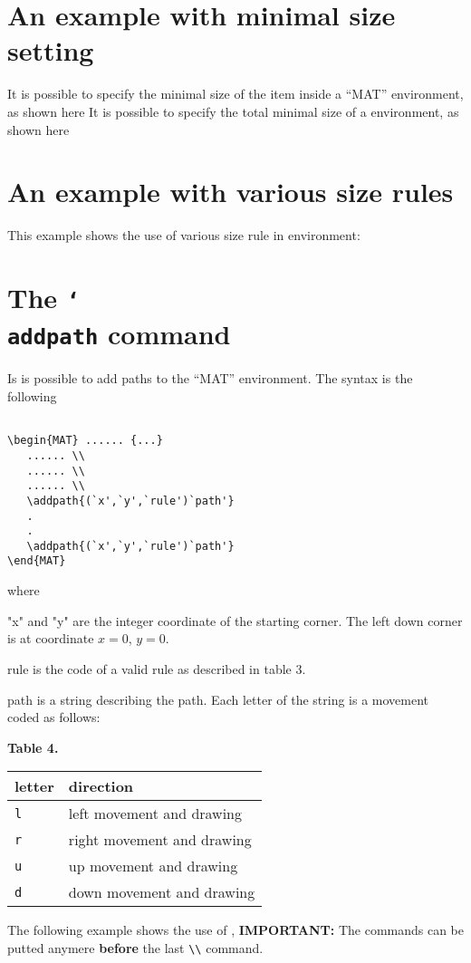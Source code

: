 \documentclass[a4paper]{article}
\begin{document}
\section{An example with minimal size setting}
It is possible to specify the minimal size of the item inside a ``MAT''
environment, as shown here
%
%
It is possible to specify the total minimal size of a 
environment, as shown here
%
%


\section{An example with various size rules}
This example shows the use of various size rule in  
environment:
%
%


\section{The \texttt{\char`\\addpath} command}
Is is possible to add paths to the ``MAT'' environment. The syntax 
is the following
\begin{verbatim}

\begin{MAT} ...... {...}
   ...... \\
   ...... \\
   ...... \\
   \addpath{(`x',`y',`rule')`path'}
   .
   .
   \addpath{(`x',`y',`rule')`path'}
\end{MAT}

\end{verbatim}
where
\begin{desc}
  \item["x" and "y"] are the integer coordinate of the starting
  corner.  The left down corner is at coordinate $x=0$, $y=0$.
  \item[rule] is the code of a valid rule as described in table 3.
  \item[path] is a string describing the path.  Each letter of the
  string is a movement coded as follows:
  \begin{center}
    \textbf{Table 4.} \\[1em]
    \begin{tabular}{|l|l|}
      \hline
      letter & direction \\
      \hline
      \verb+l+ & left movement and drawing \\
      \verb+r+ & right movement and drawing \\
      \verb+u+ & up movement and drawing \\
      \verb+d+ & down movement and drawing \\
      \hline
    \end{tabular}
  \end{center}
\end{desc}
The following example shows the use of ,
%
%
\textbf{IMPORTANT:} The commands  can be putted
anymere \textbf{before} the last \verb+\\+ command.
\end{document}

